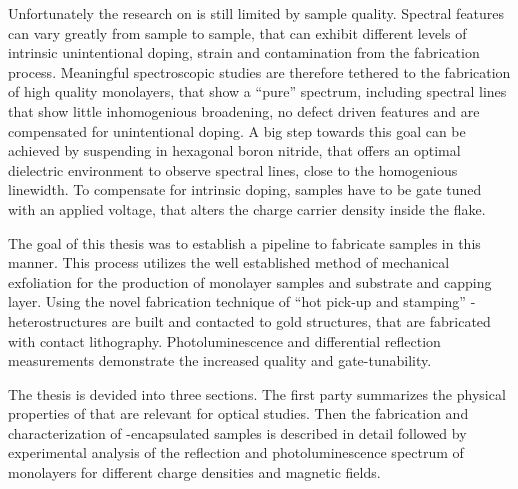 Unfortunately the research on \tmds is still limited by sample quality. Spectral features can vary greatly from sample to sample, that can exhibit different levels of intrinsic unintentional doping, strain and contamination from the fabrication process. Meaningful spectroscopic studies are therefore tethered to the fabrication of high quality monolayers, that show a ``pure'' spectrum, including spectral lines that show little inhomogenious broadening, no defect driven features and are compensated for unintentional doping. A big step towards this goal can be achieved by suspending \tmds in hexagonal boron nitride, that offers an optimal dielectric environment to observe spectral lines, close to the homogenious linewidth\cite{dean_boron_2010,cadiz_excitonic_2017}. To compensate for intrinsic doping, samples have to be gate tuned with an applied voltage, that alters the charge carrier density inside the flake.

The goal of this thesis was to establish a pipeline to fabricate samples in this manner. This process utilizes the well established method of mechanical exfoliation for the production of \tmdg monolayer samples and \hbn substrate and capping layer. Using the novel fabrication technique of ``hot pick-up and stamping'' \hbn-\tmdg heterostructures are built and contacted to gold structures, that are fabricated with contact lithography. Photoluminescence and differential reflection measurements demonstrate the increased quality and gate-tunability.

The thesis is devided into three sections. The first party summarizes the physical properties of \tmds that are relevant for optical studies. Then the fabrication and characterization of \hbn-encapsulated samples is described in detail followed by experimental analysis of the reflection and photoluminescence spectrum of \wse monolayers for different charge densities and magnetic fields.




